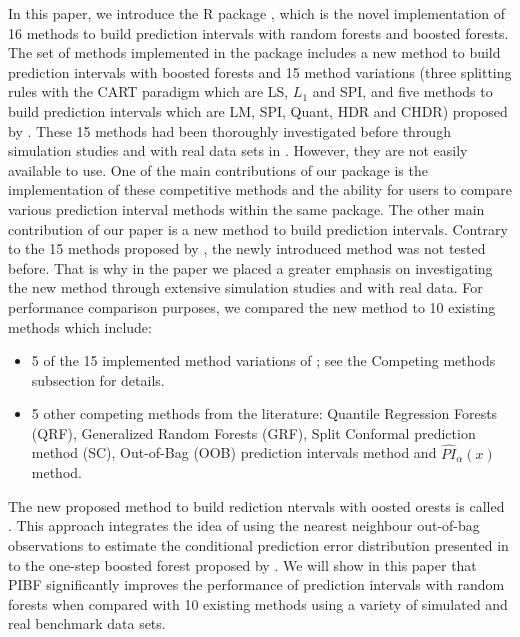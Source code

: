 In this paper, we introduce the R package  \citep{R-RFpredInterval}, which is the novel implementation of 16 methods to build prediction intervals with random forests and boosted forests. The set of methods implemented in the package includes a new method to build prediction intervals with boosted forests and 15 method variations (three splitting rules with the CART paradigm which are LS, $L_1$  and SPI, and five methods to build prediction intervals which are LM, SPI, Quant, HDR and CHDR) proposed by \citet{roy_prediction_2020}. These 15 methods had been thoroughly investigated before through simulation studies and with real data sets in \citet{roy_prediction_2020}. However, they are not easily available to use. One of the main contributions of our package is the implementation of these competitive methods and the ability for users to compare various prediction interval methods within the same package. The other main contribution of our paper is a new method to build prediction intervals. Contrary to the 15 methods proposed by \citet{roy_prediction_2020}, the newly introduced method was not tested before. That is why in the paper we placed a greater emphasis on investigating the new method through extensive simulation studies and with real data. For performance comparison purposes, we compared the new method to 10 existing methods which include: 
\begin{itemize}
	\item 5 of the 15 implemented method variations of \citet{roy_prediction_2020}; see the Competing methods subsection for details.
    \item 5 other competing methods from the literature: Quantile Regression Forests (QRF), Generalized Random Forests (GRF), Split Conformal prediction method (SC), Out-of-Bag (OOB) prediction intervals method and $\widehat {PI}_{\alpha}\left(x\right)$ method.
\end{itemize}

The new proposed method to build rediction ntervals with oosted orests is called . This approach integrates the idea of using the nearest neighbour out-of-bag observations to estimate the conditional prediction error distribution presented in \citet{lu_unified_2021} to the one-step boosted forest proposed by \citet{ghosal_boosting_2021}. We will show in this paper that PIBF significantly improves the performance of prediction intervals with random forests when compared with 10 existing methods using a variety of simulated and real benchmark data sets. 
 
